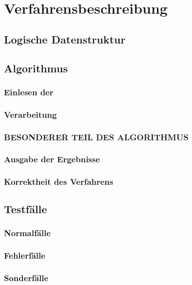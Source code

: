 \chapter{Verfahrensbeschreibung}
\label{Verfahrensbeschreibung}

\section{Logische Datenstruktur}



\section{Algorithmus}

\subsection{Einlesen der }

\subsection{Verarbeitung}

\subsection{BESONDERER TEIL DES ALGORITHMUS}

\subsection{Ausgabe der Ergebnisse}

\subsection{Korrektheit des Verfahrens}



\section{Testfälle}

\subsection{Normalfälle}

\subsection{Fehlerfälle}

\subsection{Sonderfälle}

